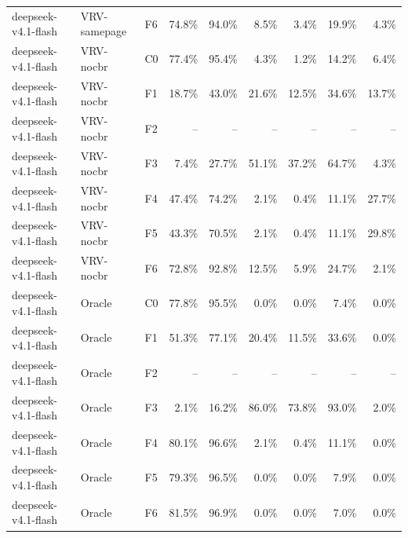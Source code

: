 \begin{tabular}{lllrrrrrr}
deepseek-v4.1-flash & VRV-samepage & F6 & 74.8\% & 94.0\% & 8.5\% & 3.4\% & 19.9\% & 4.3\% \\
deepseek-v4.1-flash & VRV-nocbr & C0 & 77.4\% & 95.4\% & 4.3\% & 1.2\% & 14.2\% & 6.4\% \\
deepseek-v4.1-flash & VRV-nocbr & F1 & 18.7\% & 43.0\% & 21.6\% & 12.5\% & 34.6\% & 13.7\% \\
deepseek-v4.1-flash & VRV-nocbr & F2 & -- & -- & -- & -- & -- & -- \\
deepseek-v4.1-flash & VRV-nocbr & F3 & 7.4\% & 27.7\% & 51.1\% & 37.2\% & 64.7\% & 4.3\% \\
deepseek-v4.1-flash & VRV-nocbr & F4 & 47.4\% & 74.2\% & 2.1\% & 0.4\% & 11.1\% & 27.7\% \\
deepseek-v4.1-flash & VRV-nocbr & F5 & 43.3\% & 70.5\% & 2.1\% & 0.4\% & 11.1\% & 29.8\% \\
deepseek-v4.1-flash & VRV-nocbr & F6 & 72.8\% & 92.8\% & 12.5\% & 5.9\% & 24.7\% & 2.1\% \\
deepseek-v4.1-flash & Oracle & C0 & 77.8\% & 95.5\% & 0.0\% & 0.0\% & 7.4\% & 0.0\% \\
deepseek-v4.1-flash & Oracle & F1 & 51.3\% & 77.1\% & 20.4\% & 11.5\% & 33.6\% & 0.0\% \\
deepseek-v4.1-flash & Oracle & F2 & -- & -- & -- & -- & -- & -- \\
deepseek-v4.1-flash & Oracle & F3 & 2.1\% & 16.2\% & 86.0\% & 73.8\% & 93.0\% & 2.0\% \\
deepseek-v4.1-flash & Oracle & F4 & 80.1\% & 96.6\% & 2.1\% & 0.4\% & 11.1\% & 0.0\% \\
deepseek-v4.1-flash & Oracle & F5 & 79.3\% & 96.5\% & 0.0\% & 0.0\% & 7.9\% & 0.0\% \\
deepseek-v4.1-flash & Oracle & F6 & 81.5\% & 96.9\% & 0.0\% & 0.0\% & 7.0\% & 0.0\% \\
\bottomrule
\end{tabular}

